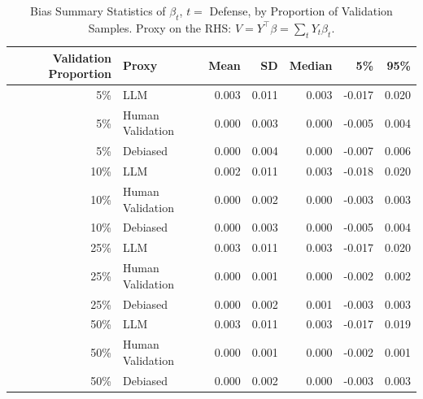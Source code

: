 \begin{table}

\caption{Bias Summary Statistics of $\beta_{t}$, $t=$ Defense, by Proportion of Validation Samples.
      Proxy on the RHS: $V = Y^\top \beta = \sum_{t} Y_t \beta_t$.}
\centering
\begin{tabular}[t]{rlrrrrr}
\toprule
Validation Proportion & Proxy & Mean & SD & Median & 5\% & 95\%\\
\midrule
5\% & LLM & 0.003 & 0.011 & 0.003 & -0.017 & 0.020\\
5\% & Human Validation & 0.000 & 0.003 & 0.000 & -0.005 & 0.004\\
5\% & Debiased & 0.000 & 0.004 & 0.000 & -0.007 & 0.006\\
10\% & LLM & 0.002 & 0.011 & 0.003 & -0.018 & 0.020\\
10\% & Human Validation & 0.000 & 0.002 & 0.000 & -0.003 & 0.003\\
10\% & Debiased & 0.000 & 0.003 & 0.000 & -0.005 & 0.004\\
25\% & LLM & 0.003 & 0.011 & 0.003 & -0.017 & 0.020\\
25\% & Human Validation & 0.000 & 0.001 & 0.000 & -0.002 & 0.002\\
25\% & Debiased & 0.000 & 0.002 & 0.001 & -0.003 & 0.003\\
50\% & LLM & 0.003 & 0.011 & 0.003 & -0.017 & 0.019\\
50\% & Human Validation & 0.000 & 0.001 & 0.000 & -0.002 & 0.001\\
50\% & Debiased & 0.000 & 0.002 & 0.000 & -0.003 & 0.003\\
\bottomrule
\end{tabular}
\end{table}
